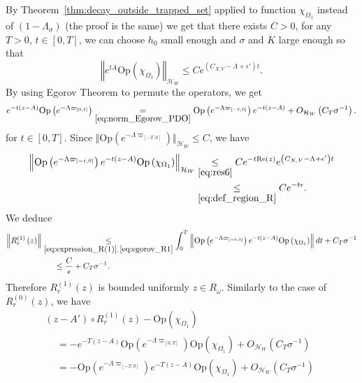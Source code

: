 \documentclass[10pt]{amsart}
\theoremstyle{definition}\newtheorem{defi}[theo]{Definition}\newtheorem{rema}[theo]{Remark}\newtheorem{exam}[theo]{Example}\newtheorem{exem}[theo]{Example}\newtheorem{nota}[theo]{Notation}
\newcommand{\clH}{\mathcal{H}}
\newcommand{\Ree}{\mathrm{Re}}
\newcommand{\Opp}{\mathrm{Op}}
\begin{document}
\pagebreak

By Theorem~\eqref{thm:decay_outside_trapped_set} applied to function $\chi_{\Omega_{1}}$ instead of $(1-\Lambda_{\sigma})$ (the proof is the same) we get that there exists $C>0$, for any $T>0$, $t\in[0,T]$, we can choose $h_{0}$ small enough and $\sigma$ and $K$ large enough so that
\begin{equation}\label{eq:res6}
\left\Vert e^{tA}\Opp \left(\chi_{\Omega_{1}}\right)\right\Vert _{\clH _{W}}\leq Ce^{\left(C_{X,V}-\Lambda+\epsilon'\right)t}.
\end{equation}
By using Egorov Theorem to permute the operators, we get
\begin{equation}\label{eq:egorov_R1}
e^{-t\left(z-A\right)}\Opp \left(e^{-\Lambda\varpi_{\left[0,t\right]}}\right)\underset{\eqref{eq:norm_Egorov_PDO}}{=}\Opp \left(e^{-\Lambda\varpi_{\left[-t,0\right]}}\right)e^{-t\left(z-A\right)}+O_{\clH _{W}}\left(C_{T}\sigma^{-1}\right).
\end{equation}
for $t\in[0,T]$. Since $\Vert \Opp (e^{-\Lambda\varpi_{[-T,0]}})\Vert _{\clH _{W}}\leq C$, we have
\begin{equation}\label{eq:res55}
\begin{split}
\left\Vert \Opp \left(e^{-\Lambda\varpi_{\left[-t,0\right]}}\right)e^{-t\left(z-A\right)}\Opp \left(\chi_{\Omega_{1}}\right)\right\Vert _{\clH _{W}} & \underset{\eqref{eq:res6}}{\leq}Ce^{-t\Ree\left(z\right)}e^{\left(C_{X,V}-\Lambda+\epsilon'\right)t}\\
& \underset{\eqref{eq:def_region_R}}{\leq}Ce^{-t\epsilon}.
\end{split}
\end{equation}
We deduce
\begin{align*}
\left\Vert R_{r}^{\left(1\right)}\left(z\right)\right\Vert & \underset{\eqref{eq:expression_R(1)},\,\eqref{eq:egorov_R1}}{\leq}\int_{0}^{T}\left\Vert \Opp \left(e^{-\Lambda\varpi_{\left[-t,0\right]}}\right)e^{-t\left(z-A\right)}\Opp \left(\chi_{\Omega_{1}}\right)\right\Vert dt+C_{T}\sigma^{-1}\\
& \mkern28mu\leq\frac{C}{\epsilon}+C_{T}\sigma^{-1}.
\end{align*}
Therefore $R_{r}^{(1)}(z)$ is bounded uniformly $z\in R_{\omega}$. Similarly to the case of $R_{r}^{(0)}(z)$, we have
\begin{multline}\label{eq:ress}
\left(z-A'\right)\circ R_{r}^{\left(1\right)}\left(z\right)-\Opp \left(\chi_{\Omega_{1}}\right)\\
\begin{aligned}
&= -e^{-T\left(z-A\right)}\Opp \left(e^{-\Lambda\varpi_{\left[0,T\right]}}\right)\Opp \left(\chi_{\Omega_{1}}\right)+O_{\clH _{W}}\left(C_{T}\sigma^{-1}\right)\\
&=  -\Opp \left(e^{-\Lambda\varpi_{\left[-T,0\right]}}\right)e^{-T\left(z-A\right)}\Opp \left(\chi_{\Omega_{1}}\right)+O_{\clH _{W}}\left(C_{T}\sigma^{-1}\right)
\end{aligned}
\end{multline}
\end{document}
